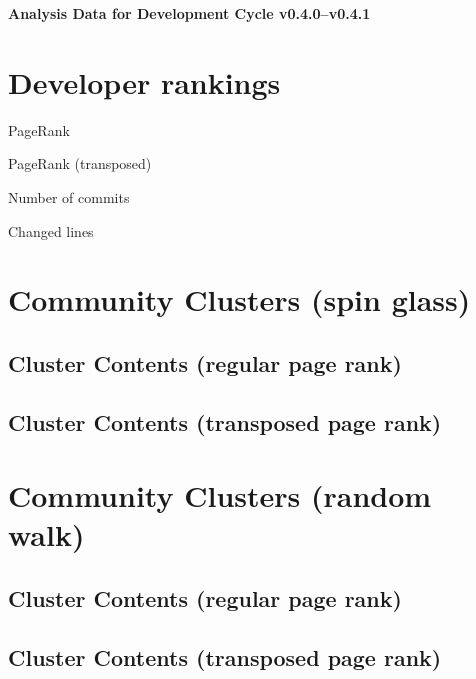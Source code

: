 \documentclass{article}
\begin{document}
\setlength{\parindent}{0pt}
\begin{center}
\begin{Large}
\textbf{Analysis Data for Development Cycle v0.4.0--v0.4.1}
\end{Large}
\end{center}
\section{Developer rankings}
\begin{small}\renewcommand{\tabcolsep}{1pt}
\begin{minipage}{0.5\linewidth}
PageRank\\

\end{minipage}%
\begin{minipage}{0.5\linewidth}
PageRank (transposed)\\

\end{minipage}

\renewcommand{\tabcolsep}{5pt}
\begin{minipage}{0.5\linewidth}
Number of commits\\

\end{minipage}%
\begin{minipage}{0.5\linewidth}
Changed lines\\

\end{minipage}
\end{small}
\newpage\section{Community Clusters (spin glass)}
\subsection{Cluster Contents (regular page rank)}
\newpage\subsection{Cluster Contents (transposed page rank)}
\newpage\section{Community Clusters (random walk)}
\subsection{Cluster Contents (regular page rank)}
\newpage\subsection{Cluster Contents (transposed page rank)}
\end{document}
